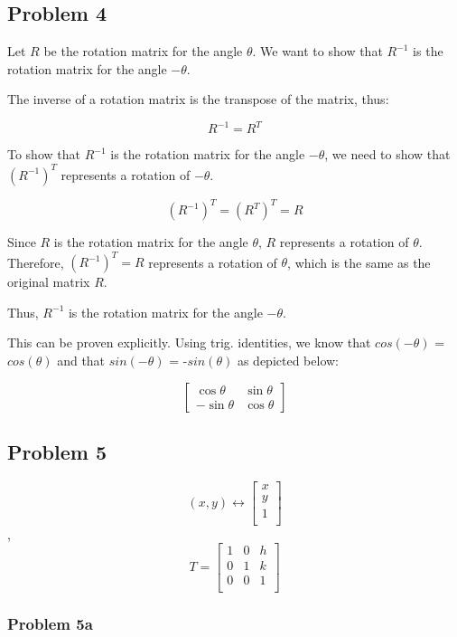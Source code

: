 \documentclass{article}
\begin{document}
\subsection*{Problem 4}

Let $R$ be the rotation matrix for the angle $\theta$. We want to show that $R^{-1}$ is the rotation matrix for the angle $-\theta$.

The inverse of a rotation matrix is the transpose of the matrix, thus:

\[
R^{-1} = R^T
\]

To show that $R^{-1}$ is the rotation matrix for the angle $-\theta$, we need to show that $(R^{-1})^T$ represents a rotation of $-\theta$.

\[
(R^{-1})^T = (R^T)^T = R
\]

Since $R$ is the rotation matrix for the angle $\theta$, $R$ represents a rotation of $\theta$. Therefore, $(R^{-1})^T = R$ represents a rotation of $\theta$, which is the same as the original matrix $R$. 

Thus, $R^{-1}$ is the rotation matrix for the angle $-\theta$.

This can be proven explicitly. Using trig. identities, we know that $cos(-\theta)$ = $cos(\theta)$
and that $sin(-\theta)$ = -$sin(\theta)$ as depicted below:

\[
\begin{bmatrix}
\cos \theta & \sin \theta \\
-\sin \theta & \cos \theta
\end{bmatrix}
\]

\subsection*{Problem 5}
\[
(x, y) \leftrightarrow 
  \left[ {\begin{array}{c}
    x\\
    y\\
    1\\    
  \end{array} } \right]
\],
\[
  T =
  \left[ {\begin{array}{ccc}
    1 & 0 & h\\
    0 & 1 & k\\
    0 & 0 & 1\\
  \end{array} } \right]
\]

\subsubsection*{Problem 5a}
\end{document}
